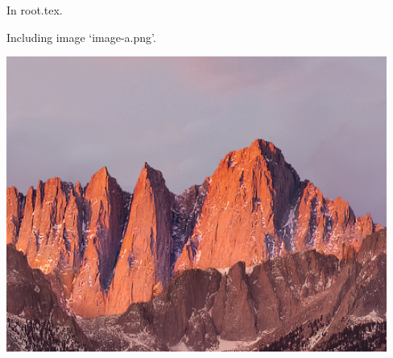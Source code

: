 \documentclass{article}
\begin{document}
In root.tex.

Including image `image-a.png'.

\includegraphics{images/image-a}


\end{document}
